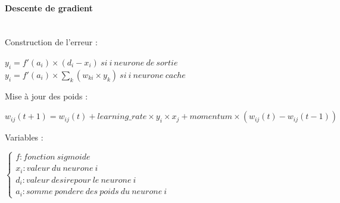\documentclass[a4paper,12pt]{article}
\begin{document}
      \paragraph{Descente de gradient} \cite{Touzet_1992} \\
	Construction de l'erreur : 
	  \begin{center}
	    $y_{i} = f'(a_i) \times ( d_i - x_i ) \ si\ i\ neurone\ de\ sortie $ \\
	    $y_{i} = f'(a_i) \times \sum \limits_{k} ( w_{ki} \times y_k )\ si\ i\ neurone\ cache $
	  \end{center}
	Mise à jour des poids :
	  \begin{center}
	    $w_{ij}(t+1) = w_{ij}(t) + learning\_rate \times y_{i} \times x_j + momentum \times 
	    (w_{ij}(t) - w_{ij}(t-1) )$
	  \end{center}
	Variables : 
	  \begin{center}
	    $\left\lbrace \begin{array}{lll} 
	      f : fonction\ sigmoide \\
	      x_i : valeur\ du\ neurone\ i\\
	      d_i : valeur\ desire pour\ le\ neurone\ i\\
	      a_i : somme\ pondere\ des\ poids\ du\ neurone\ i
	    \end{array} \right.$
	  \end{center}
	
  
  
\end{document}
